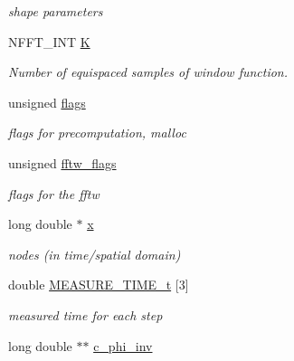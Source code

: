 \begin{DoxyCompactItemize}
\begin{DoxyCompactList}\small\item\em shape parameters \end{DoxyCompactList}\item 
N\-F\-F\-T\-\_\-\-I\-N\-T \hyperlink{structnfctl__plan_a0a11ee75ee2bc2f21adf403d0fca7f80}{K}
\begin{DoxyCompactList}\small\item\em Number of equispaced samples of window function. \end{DoxyCompactList}\item 
\hypertarget{structnfctl__plan_a5efaf28cc779ed09e1ff9e1043eb2b41}{unsigned \hyperlink{structnfctl__plan_a5efaf28cc779ed09e1ff9e1043eb2b41}{flags}}\label{structnfctl__plan_a5efaf28cc779ed09e1ff9e1043eb2b41}

\begin{DoxyCompactList}\small\item\em flags for precomputation, malloc \end{DoxyCompactList}\item 
\hypertarget{structnfctl__plan_afc96567eba0053563867b8e3a064902b}{unsigned \hyperlink{structnfctl__plan_afc96567eba0053563867b8e3a064902b}{fftw\-\_\-flags}}\label{structnfctl__plan_afc96567eba0053563867b8e3a064902b}

\begin{DoxyCompactList}\small\item\em flags for the fftw \end{DoxyCompactList}\item 
\hypertarget{structnfctl__plan_a2f7f915bfefa105412cabfc368c26560}{long double $\ast$ \hyperlink{structnfctl__plan_a2f7f915bfefa105412cabfc368c26560}{x}}\label{structnfctl__plan_a2f7f915bfefa105412cabfc368c26560}

\begin{DoxyCompactList}\small\item\em nodes (in time/spatial domain) \end{DoxyCompactList}\item 
\hypertarget{structnfctl__plan_a2c6b9d81be06f2e557c410310420809f}{double \hyperlink{structnfctl__plan_a2c6b9d81be06f2e557c410310420809f}{M\-E\-A\-S\-U\-R\-E\-\_\-\-T\-I\-M\-E\-\_\-t} \mbox{[}3\mbox{]}}\label{structnfctl__plan_a2c6b9d81be06f2e557c410310420809f}

\begin{DoxyCompactList}\small\item\em measured time for each step \end{DoxyCompactList}\item 
\hypertarget{structnfctl__plan_a2b69489da0118e06cba24db6d73ea934}{long double $\ast$$\ast$ \hyperlink{structnfctl__plan_a2b69489da0118e06cba24db6d73ea934}{c\-\_\-phi\-\_\-inv}}\label{structnfctl__plan_a2b69489da0118e06cba24db6d73ea934}


\end{DoxyCompactItemize}
